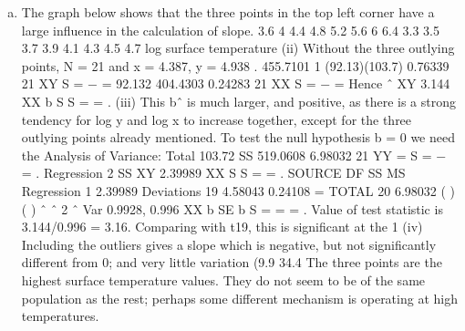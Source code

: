 \documentclass[a4paper,12pt]{article}
\begin{document}

\begin{enumerate}[(a)]
\item  The graph below shows that the three points in the top left corner have a large
influence in the calculation of slope.
3.6
4
4.4
4.8
5.2
5.6
6
6.4
3.3 3.5 3.7 3.9 4.1 4.3 4.5 4.7
log surface temperature
(ii) Without the three outlying points, N = 21 and x = 4.387, y = 4.938 .
455.7101 1 (92.13)(103.7) 0.76339
21 XY S = − =
92.132 404.4303 0.24283
21 XX S = − =
Hence ˆ XY 3.144
XX
b S
S
= = .
(iii) This bˆ is much larger, and positive, as there is a strong tendency for log y and
log x to increase together, except for the three outlying points already mentioned.
To test the null hypothesis b = 0 we need the Analysis of Variance:
Total
103.72 SS 519.0608 6.98032
21 YY = S = − = .
Regression
2
SS XY 2.39989
XX
S
S
= = .
SOURCE DF SS MS
Regression 1 2.39989
Deviations 19 4.58043 0.24108 = 
TOTAL 20 6.98032
( ) ( ) ˆ ˆ 2 ˆ Var 0.9928, 0.996
XX
b SE b
S
= \sigma = = .
Value of test statistic is 3.144/0.996 = 3.16. Comparing with t19, this is significant at
the 1%
(iv) Including the outliers gives a slope which is negative, but not significantly
different from 0; and very little variation (9.9%
34.4%
The three points are the highest surface temperature values. They do not seem to be
of the same population as the rest; perhaps some different mechanism is operating at
high temperatures.
\end{enumerate}
\end{document}
